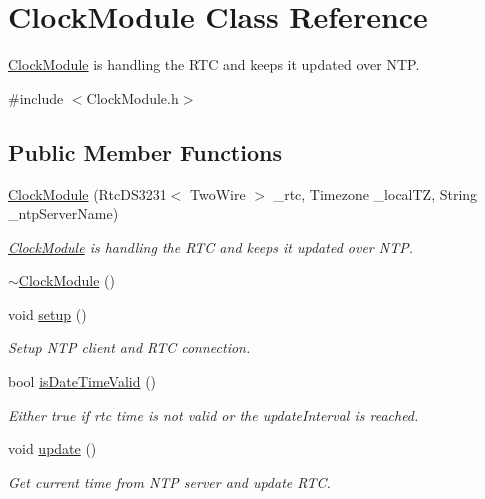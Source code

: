 \hypertarget{class_clock_module}{}\section{Clock\+Module Class Reference}
\label{class_clock_module}


\mbox{\hyperlink{class_clock_module}{Clock\+Module}} is handling the R\+TC and keeps it updated over N\+TP.  




{\ttfamily \#include $<$Clock\+Module.\+h$>$}

\subsection*{Public Member Functions}
\begin{DoxyCompactItemize}
\item 
\mbox{\hyperlink{class_clock_module_a13599210b0032bbc5312d93e690c763b}{Clock\+Module}} (Rtc\+D\+S3231$<$ Two\+Wire $>$ \+\_\+rtc, Timezone \+\_\+local\+TZ, String \+\_\+ntp\+Server\+Name)
\begin{DoxyCompactList}\small\item\em \mbox{\hyperlink{class_clock_module}{Clock\+Module}} is handling the R\+TC and keeps it updated over N\+TP. \end{DoxyCompactList}\item 
\mbox{\hyperlink{class_clock_module_a7e2e3fc944235bc3d779150fb2ea5063}{$\sim$\+Clock\+Module}} ()
\item 
void \mbox{\hyperlink{class_clock_module_a6113cfe778efff0aa237696f85516796}{setup}} ()
\begin{DoxyCompactList}\small\item\em Setup N\+TP client and R\+TC connection. \end{DoxyCompactList}\item 
bool \mbox{\hyperlink{class_clock_module_a05053d7409ef43d1729113a7912fa866}{is\+Date\+Time\+Valid}} ()
\begin{DoxyCompactList}\small\item\em Either true if rtc time is not valid or the update\+Interval is reached. \end{DoxyCompactList}\item 
void \mbox{\hyperlink{class_clock_module_afbc823bb09d912dbdc25f9d38ec78624}{update}} ()
\begin{DoxyCompactList}\small\item\em Get current time from N\+TP server and update R\+TC. \end{DoxyCompactList}\item 

\end{DoxyCompactItemize}
